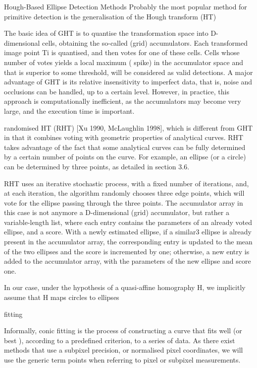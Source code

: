 \documentclass[a4paper]{report}
\begin{document}
Hough-Based Ellipse Detection Methods
Probably the most popular method for primitive detection is the generalisation of the Hough transform (HT)

The
basic idea of GHT is to quantise the transformation space into D-dimensional cells, obtaining
the so-called (grid) accumulators. Each transformed image point Ti is quantised, and then
votes for one of these cells. Cells whose number of votes yields a local maximum ( spike) in the
accumulator space and that is superior to some threshold, will be considered as valid detections.
A major advantage of GHT is its relative insensitivity to imperfect data, that is, noise
and occlusions can be handled, up to a certain level. However, in practice, this approach is
computationally inefficient, as the accumulators may become very large, and the execution
time is important.

randomised HT (RHT) [Xu 1990, McLaughlin 1998],
which is different from GHT in that it combines voting with geometric properties of analytical
curves. RHT takes advantage of the fact that some analytical curves can be fully determined by
a certain number of points on the curve. For example, an ellipse (or a circle) can be determined
by three points, as detailed in section 3.6.

RHT uses an iterative stochastic process, with a
fixed number of iterations, and, at each iteration, the algorithm randomly chooses three edge
points, which will vote for the ellipse passing through the three points. The accumulator array
in this case is not anymore a D-dimensional (grid) accumulator, but rather a variable-length
list, where each entry contains the parameters of an already voted ellipse, and a score. With
a newly estimated ellipse, if a similar3 ellipse is already present in the accumulator array, the
corresponding entry is updated to the mean of the two ellipses and the score is incremented by
one; otherwise, a new entry is added to the accumulator array, with the parameters of the new
ellipse and score one.

In our case, under the hypothesis of a
quasi-affine homography H, we implicitly assume that H maps circles to ellipses


fitting

Informally, conic fitting is the process of constructing a curve that fits well (or best ), according
to a predefined criterion, to a series of data.
As there exist methods that
use a subpixel precision, or normalised pixel coordinates, we will use the generic term points
when referring to pixel or subpixel measurements.
\end{document}
